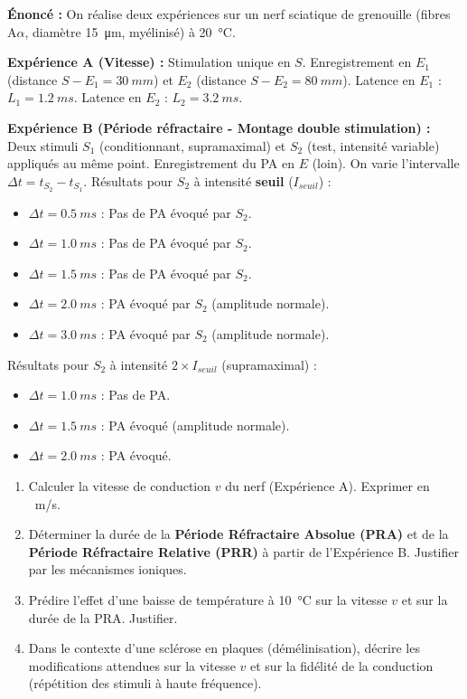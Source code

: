 \documentclass[11pt]{article}
\begin{document}
\begin{exoresolu}
\textbf{Énoncé :} On réalise deux expériences sur un nerf sciatique de grenouille (fibres A$\alpha$, diamètre \SI{15}{\micro m}, myélinisé) à \SI{20}{\celsius}.

\textbf{Expérience A (Vitesse) :} Stimulation unique en $S$. Enregistrement en $E_1$ (distance $S-E_1 = \SI{30}{mm}$) et $E_2$ (distance $S-E_2 = \SI{80}{mm}$).
Latence en $E_1$ : $L_1 = \SI{1,2}{ms}$. Latence en $E_2$ : $L_2 = \SI{3,2}{ms}$.

\textbf{Expérience B (Période réfractaire - Montage double stimulation) :} Deux stimuli $S_1$ (conditionnant, supramaximal) et $S_2$ (test, intensité variable) appliqués au même point. Enregistrement du PA en $E$ (loin). On varie l'intervalle $\Delta t = t_{S_2} - t_{S_1}$.
Résultats pour $S_2$ à intensité \textbf{seuil} ($I_{seuil}$) :
\begin{itemize}
    \item $\Delta t = \SI{0,5}{ms}$ : Pas de PA évoqué par $S_2$.
    \item $\Delta t = \SI{1,0}{ms}$ : Pas de PA évoqué par $S_2$.
    \item $\Delta t = \SI{1,5}{ms}$ : Pas de PA évoqué par $S_2$.
    \item $\Delta t = \SI{2,0}{ms}$ : PA évoqué par $S_2$ (amplitude normale).
    \item $\Delta t = \SI{3,0}{ms}$ : PA évoqué par $S_2$ (amplitude normale).
\end{itemize}
Résultats pour $S_2$ à intensité \textbf{$2 \times I_{seuil}$} (supramaximal) :
\begin{itemize}
    \item $\Delta t = \SI{1,0}{ms}$ : Pas de PA.
    \item $\Delta t = \SI{1,5}{ms}$ : PA évoqué (amplitude normale).
    \item $\Delta t = \SI{2,0}{ms}$ : PA évoqué.
\end{itemize}

\begin{enumerate}
    \item Calculer la vitesse de conduction $v$ du nerf (Expérience A). Exprimer en \SI{}{m/s}.
    \item Déterminer la durée de la \textbf{Période Réfractaire Absolue (PRA)} et de la \textbf{Période Réfractaire Relative (PRR)} à partir de l'Expérience B. Justifier par les mécanismes ioniques.
    \item Prédire l'effet d'une baisse de température à \SI{10}{\celsius} sur la vitesse $v$ et sur la durée de la PRA. Justifier.
    \item Dans le contexte d'une sclérose en plaques (démélinisation), décrire les modifications attendues sur la vitesse $v$ et sur la fidélité de la conduction (répétition des stimuli à haute fréquence).
\end{enumerate}


\end{exoresolu}
\end{document}
